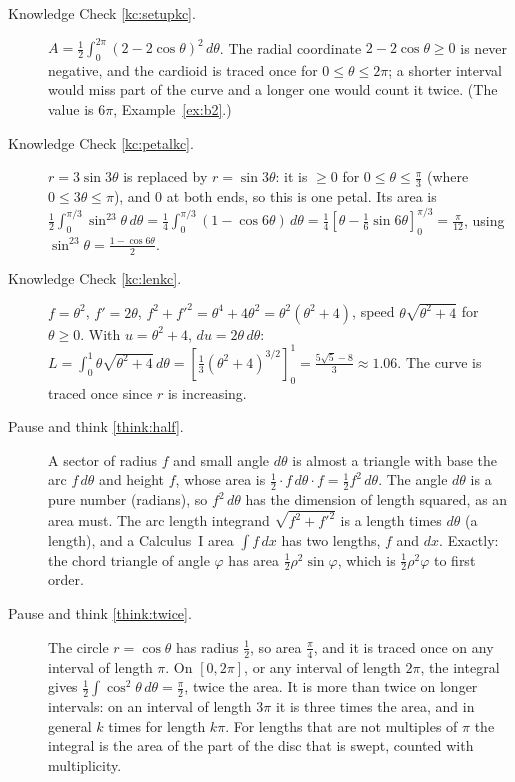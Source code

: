 \documentclass[11pt]{article}
\begin{document}
\begin{description}
  \item[Knowledge Check \ref{kc:setupkc}.] $A=\frac12\int_0^{2\pi}(2-2\cos\theta)^2\,d\theta$. The radial coordinate $2-2\cos\theta\ge0$ is never negative, and the cardioid is traced once for $0\le\theta\le2\pi$; a shorter interval would miss part of the curve and a longer one would count it twice. (The value is $6\pi$, Example~\ref{ex:b2}.)
  \item[Knowledge Check \ref{kc:petalkc}.] $r=3\sin3\theta$ is replaced by $r=\sin3\theta$: it is $\ge0$ for $0\le\theta\le\frac\pi3$ (where $0\le3\theta\le\pi$), and $0$ at both ends, so this is one petal. Its area is $\frac12\int_0^{\pi/3}\sin^23\theta\,d\theta=\frac14\int_0^{\pi/3}(1-\cos6\theta)\,d\theta=\frac14\left[\theta-\frac16\sin6\theta\right]_0^{\pi/3}=\frac\pi{12}$, using $\sin^23\theta=\frac{1-\cos6\theta}2$.
  \item[Knowledge Check \ref{kc:lenkc}.] $f=\theta^2$, $f'=2\theta$, $f^2+f'^2=\theta^4+4\theta^2=\theta^2\left(\theta^2+4\right)$, speed $\theta\sqrt{\theta^2+4}$ for $\theta\ge0$. With $u=\theta^2+4$, $du=2\theta\,d\theta$: $L=\int_0^1\theta\sqrt{\theta^2+4}\,d\theta=\left[\frac13\left(\theta^2+4\right)^{3/2}\right]_0^1=\frac{5\sqrt5-8}3\approx1.06$. The curve is traced once since $r$ is increasing.
  \item[Pause and think \ref{think:half}.] A sector of radius $f$ and small angle $d\theta$ is almost a triangle with base the arc $f\,d\theta$ and height $f$, whose area is $\frac12\cdot f\,d\theta\cdot f=\frac12f^2\,d\theta$. The angle $d\theta$ is a pure number (radians), so $f^2\,d\theta$ has the dimension of length squared, as an area must. The arc length integrand $\sqrt{f^2+f'^2}$ is a length times $d\theta$ (a length), and a Calculus~I area $\int f\,dx$ has two lengths, $f$ and $dx$. Exactly: the chord triangle of angle $\varphi$ has area $\frac12\rho^2\sin\varphi$, which is $\frac12\rho^2\varphi$ to first order.
  \item[Pause and think \ref{think:twice}.] The circle $r=\cos\theta$ has radius $\frac12$, so area $\frac\pi4$, and it is traced once on any interval of length $\pi$. On $[0,2\pi]$, or any interval of length $2\pi$, the integral gives $\frac12\int\cos^2\theta\,d\theta=\frac\pi2$, twice the area. It is more than twice on longer intervals: on an interval of length $3\pi$ it is three times the area, and in general $k$ times for length $k\pi$. For lengths that are not multiples of $\pi$ the integral is the area of the part of the disc that is swept, counted with multiplicity.

\end{description}
\end{document}
